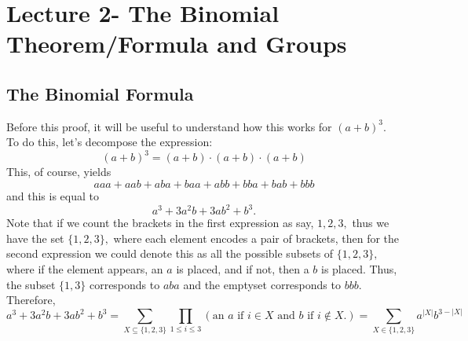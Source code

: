 \documentclass[oneside]{book}
\begin{document}
\newpage

\chapter{Lecture 2- The Binomial Theorem/Formula and Groups}
\section{The Binomial Formula}
Before this proof, it will be useful to understand how this works for $(a+b)^3.$ To do this, let's decompose the expression:
\[(a+b)^3 = (a+b) \cdot (a+b)\cdot (a+b)\] This, of course, yields \[aaa + aab + aba + baa + abb + bba + bab + bbb\] and this is equal to \[a^3 + 3a^2b + 3ab^2 + b^3.\] Note that if we count the brackets in the first expression as say, $1,2,3,$ thus we have the set $\{1,2,3\},$ where each element encodes a pair of brackets, then for the second expression we could denote this as all the possible subsets of $\{1,2,3\},$ where if the element appears, an $a$ is placed, and if not, then a $b$ is placed. Thus, the subset $\{1,3\}$ corresponds to $aba$ and the emptyset corresponds to $bbb.$
Therefore, \[a^3 + 3a^2b + 3ab^2 + b^3 = \sum_{X\subseteq \{1,2,3\}} \prod_{1\leq i \leq 3}(\text{an $a$ if $i \in X$ and $b$ if $i \notin X.$}) = \sum_{X \in \{1,2,3\}} a^{|X|}b^{3-|X|}\]

\cor{\[2^n = \binom{n}{0}+ \binom{n}{1} + \binom{n}{2} + \dots + \binom{n}{n}\]}
\pf{\[2^n = (1+1)^n = \binom{n}{0}+ \binom{n}{1} + \binom{n}{2} + \dots + \binom{n}{n}\]}
\end{document}
